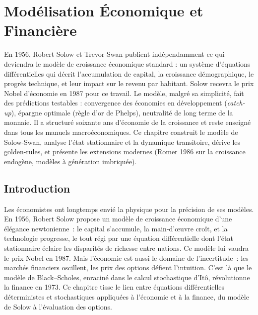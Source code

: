 \chapter{Mod\'elisation \'Economique et Financi\`ere}
\label{ch:economique}

En 1956, Robert Solow et Trevor Swan publient indépendamment ce qui deviendra le modèle de croissance économique standard : un système d'équations différentielles qui décrit l'accumulation de capital, la croissance démographique, le progrès technique, et leur impact sur le revenu par habitant. Solow recevra le prix Nobel d'économie en 1987 pour ce travail. Le modèle, malgré sa simplicité, fait des prédictions testables : convergence des économies en développement (\emph{catch-up}), épargne optimale (règle d'or de Phelps), neutralité de long terme de la monnaie. Il a structuré soixante ans d'économie de la croissance et reste enseigné dans tous les manuels macroéconomiques. Ce chapitre construit le modèle de Solow-Swan, analyse l'état stationnaire et la dynamique transitoire, dérive les golden-rules, et présente les extensions modernes (Romer 1986 sur la croissance endogène, modèles à génération imbriquée).

\section{Introduction}

Les \'economistes ont longtemps envi\'e la physique pour la pr\'ecision de ses mod\`eles. En 1956, Robert Solow propose un mod\`ele de croissance \'economique d'une \'el\'egance newtonienne~: le capital s'accumule, la main-d'\oe uvre cro\^it, et la technologie progresse, le tout r\'egi par une \'equation diff\'erentielle dont l'\'etat stationnaire \'eclaire les disparit\'es de richesse entre nations. Ce mod\`ele lui vaudra le prix Nobel en 1987. Mais l'\'economie est aussi le domaine de l'incertitude~: les march\'es financiers oscillent, les prix des options d\'efient l'intuition. C'est l\`a que le mod\`ele de Black--Scholes, enracin\'e dans le calcul stochastique d'It\^o, r\'evolutionne la finance en 1973. Ce chapitre tisse le lien entre \'equations diff\'erentielles d\'eterministes et stochastiques appliqu\'ees \`a l'\'economie et \`a la finance, du mod\`ele de Solow \`a l'\'evaluation des options.

